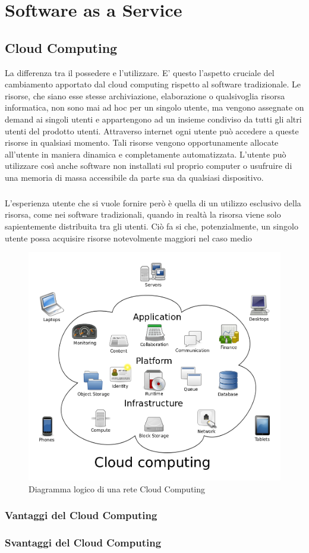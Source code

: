 \chapter{Software as a Service}

\section{Cloud Computing}
La differenza tra il possedere e l'utilizzare. E' questo l'aspetto cruciale del cambiamento apportato dal cloud computing rispetto al software tradizionale. Le risorse, che siano esse stesse archiviazione, elaborazione o qualsivoglia risorsa informatica, non sono mai ad hoc per un singolo utente, ma vengono assegnate on demand ai singoli utenti e appartengono ad un insieme condiviso da tutti gli altri utenti del prodotto utenti. Attraverso internet ogni utente può accedere a queste risorse in qualsiasi momento. Tali risorse vengono opportunamente allocate all'utente in maniera dinamica e completamente automatizzata. L'utente può utilizzare così anche software non installati sul proprio computer o usufruire di una memoria di massa accessibile da parte sua da qualsiasi dispositivo.
\paragraph{}
L'esperienza utente che si vuole fornire però è quella di un utilizzo esclusivo della risorsa, come nei software tradizionali, quando in realtà la risorsa viene solo sapientemente distribuita tra gli utenti. Ciò fa si che, potenzialmente, un singolo utente possa acquisire risorse notevolmente maggiori nel caso medio
\begin{figure}
	\centering
	\includegraphics[width=0.7\linewidth]{capitoli/imgs/CloudComputing}
	\caption{Diagramma logico di una rete Cloud Computing}
	\label{fig:cloudcomputing}
\end{figure}
\subsection{Vantaggi del Cloud Computing}
\subsection{Svantaggi del Cloud Computing}